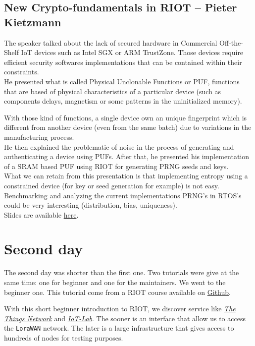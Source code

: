 \documentclass[journal, a4paper]{../IEEEtran}
\begin{document}
\subsection{New Crypto-fundamentals in RIOT -- Pieter Kietzmann}

The speaker talked about the lack of secured hardware in Commercial Off-the-Shelf IoT devices such as Intel SGX or ARM TrustZone.
Those devices require efficient security softwares implementations that can be contained within their constraints.\\

He presented what is called Physical Unclonable Functions or PUF, 
    functions that are based of physical characteristics of a particular device (such as components delays, magnetism or some patterns in the uninitialized memory).

With those kind of functions, a single device own an unique fingerprint which is different from another device (even from the same batch) due to variations in the manufacturing process. \\

He then explained the problematic of noise in the process of generating and authenticating a device using PUFs.
After that, he presented his implementation of a SRAM based PUF using RIOT for generating PRNG seeds and keys. \\

What we can retain from this presentation is that implementing entropy using a constrained device (for key or seed generation for example) is not easy. \\
Benchmarking and analyzing the current implementations PRNG's in RTOS's could be very interesting (distribution, bias, uniqueness). \\

Slides are available \href{http://summit.riot-os.org/2018/wp-content/uploads/sites/10/2018/09/3_2-Peter-Kietzmann-Crypto-Fundamentals.pdf}{here}.

\section{Second day}
The second day was shorter than the first one.
Two tutorials were give at the same time: one for beginner and one for the maintainers.
We went to the beginner one.
This tutorial come from a RIOT course available on \href{https://github.com/aabadie/riot-course}{Github}.

With this short beginner introduction to RIOT, we discover service like \textit{\href{https://www.thethingsnetwork.org/}{The Things Network}} and \textit{\href{https://www.iot-lab.info/}{IoT-Lab}}. 
The sooner is an interface that allow us to access the \texttt{LoraWAN} network. 
The later is a large infrastructure that gives access to hundreds of nodes for testing purposes.
\end{document}
